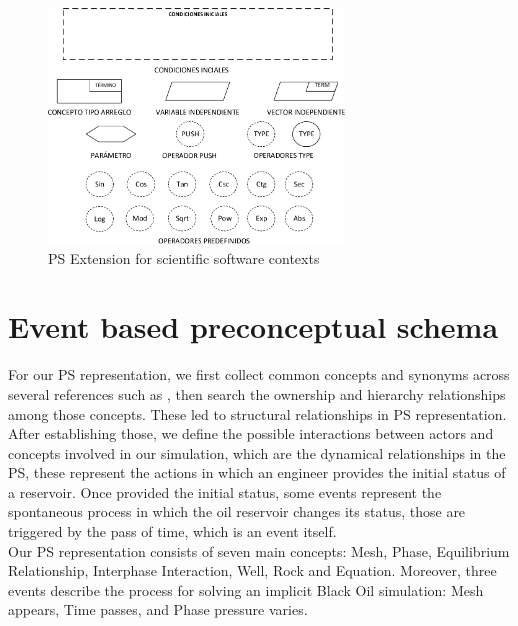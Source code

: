 \documentclass[review]{elsarticle}
\begin{document}
\begin{figure}
	\centering
	\includegraphics[width=0.7\textwidth]{Figures/NuevosElementosDelEP.pdf}
	\caption{PS Extension for scientific software contexts \cite{zapata2013Eventos}}
	\label{fig:PS_Extended}
\end{figure}



\section{Event based preconceptual schema}\label{sec:representation}
For our PS representation, we first collect common concepts and synonyms across several references such as \cite{jamal2006petroleum,Bear2018,ertekin2001basic,Cao2002,Flemisch2011,HerreraCG2016,IsazaCN2017,Mohammad2017,MozoID2017,Qiao2017,cao2002development}, then search the ownership and hierarchy relationships among those concepts. These led to structural relationships in PS representation. After establishing those, we define the possible interactions between actors and concepts involved in our simulation, which are the dynamical relationships in the PS, these represent the actions in which an engineer provides the initial status of a reservoir. Once provided the initial status, some events represent the spontaneous process in which the oil reservoir changes its status, those are triggered by the pass of time, which is an event itself.\\ 
 
Our PS representation consists of seven main concepts: Mesh, Phase, Equilibrium Relationship, Interphase Interaction, Well, Rock and Equation. Moreover, three events describe the process for solving an implicit Black Oil simulation: Mesh appears, Time passes, and Phase pressure varies. 
\end{document}
